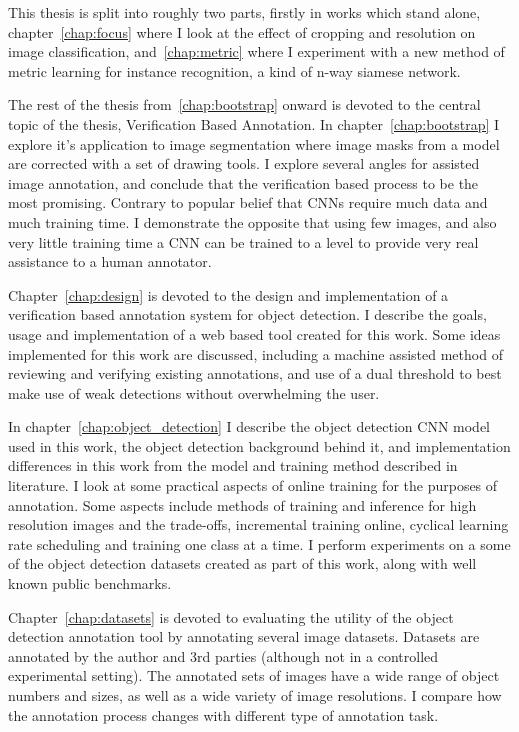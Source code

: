 This thesis is split into roughly two parts, firstly in works which stand alone, chapter~\ref{chap:focus} where I look at the effect of cropping and resolution on image classification, and~\ref{chap:metric} where I experiment with a new method of metric learning for instance recognition, a kind of n-way siamese network. 

The rest of the thesis from~\ref{chap:bootstrap} onward is devoted to the central topic of the thesis, Verification Based Annotation. In chapter~\ref{chap:bootstrap} I explore it's application to image segmentation where image masks from a model are corrected with a set of drawing tools. I explore several angles for assisted image annotation, and conclude that the verification based process to be the most promising. Contrary to popular belief that \gls{CNN}s require much data and much training time. I demonstrate the opposite that using few images, and also very little training time a \gls{CNN} can be trained to a level to provide very real assistance to a human annotator. 

Chapter~\ref{chap:design} is devoted to the design and implementation of a verification based annotation system for object detection. I describe the goals, usage and implementation of a web based tool created for this work. Some ideas implemented for this work are discussed, including a machine assisted method of reviewing and verifying existing annotations, and use of a dual threshold to best make use of weak detections without overwhelming the user.

In chapter~\ref{chap:object_detection} I describe the object detection \gls{CNN} model used in this work, the object detection background behind it, and implementation differences in this work from the model and training method described in literature. I look at some practical aspects of online training for the purposes of annotation. Some aspects include methods of training and inference for high resolution images and the trade-offs, incremental training online, cyclical learning rate scheduling and training one class at a time. I perform experiments on a some of the object detection datasets created as part of this work, along with well known public benchmarks.

Chapter~\ref{chap:datasets} is devoted to evaluating the utility of the object detection annotation tool by annotating several image datasets. Datasets are annotated by the author and 3rd parties (although not in a controlled experimental setting). The annotated sets of images have a wide range of object numbers and sizes, as well as a wide variety of image resolutions. I compare how the annotation process changes with different type of annotation task. 

